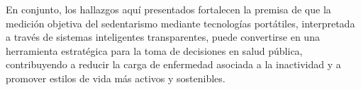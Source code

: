 En conjunto, los hallazgos aquí presentados fortalecen la premisa de que la medición objetiva del sedentarismo mediante tecnologías portátiles, interpretada a través de sistemas inteligentes transparentes, puede convertirse en una herramienta estratégica para la toma de decisiones en salud pública, contribuyendo a reducir la carga de enfermedad asociada a la inactividad y a promover estilos de vida más activos y sostenibles.

%
%
%

